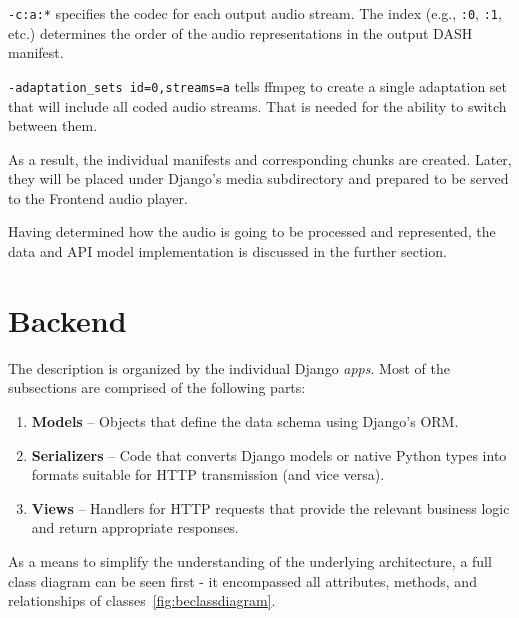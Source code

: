 \texttt{-c:a:*} specifies the codec for each output audio stream.
The index (e.g., \texttt{:0}, \texttt{:1}, etc.) determines the order of the audio representations
in the output DASH manifest.

\texttt{-adaptation\_sets id=0,streams=a} tells ffmpeg to create a single adaptation set that will include all
coded audio streams. That is needed for the ability to switch between them.

As a result, the individual manifests and corresponding chunks are created.
Later, they will be placed under Django's media subdirectory
and prepared to be served to the Frontend audio player.

Having determined how the audio is going to be processed and represented, the data and API model
implementation is discussed in the further section.


\section{Backend}
The description is organized by the individual Django \textit{apps}.
Most of the subsections are comprised of the following parts:

\begin{enumerate}
    \item \textbf{Models} – Objects that define the data schema using Django's ORM.
    \item \textbf{Serializers} – Code that converts Django models or native Python types into
    formats suitable for HTTP transmission (and vice versa).
    \item \textbf{Views} – Handlers for HTTP requests
    that provide the relevant business logic and return appropriate responses.
\end{enumerate}

As a means to simplify the understanding of the underlying architecture, a full class diagram can be
seen first - it encompassed all attributes, methods, and relationships of classes~\ref{fig:beclassdiagram}.

